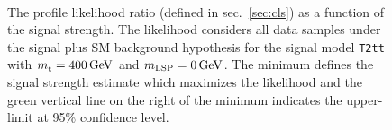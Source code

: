 \begin{figure}[t!]
  \begin{center}
     \\
    \caption{\label{fig:t2cc-int-400}The profile likelihood ratio 
      (defined in sec.~\ref{sec:cls}) as a function of the signal strength.
      The likelihood considers all data samples under the signal plus SM 
      background hypothesis for the signal model \texttt{T2tt} with 
      $m_{\tilde{\rm t}} = 400\,\text{Ge\hspace{-.08em}V}$ and $m_{\text{LSP}} = 0\,\text{Ge\hspace{-.08em}V}$.
      The minimum defines the signal strength estimate which maximizes the
      likelihood and the green vertical line on the right of the minimum 
      indicates the upper-limit at 95\% confidence level.}
  \end{center}
\end{figure}

